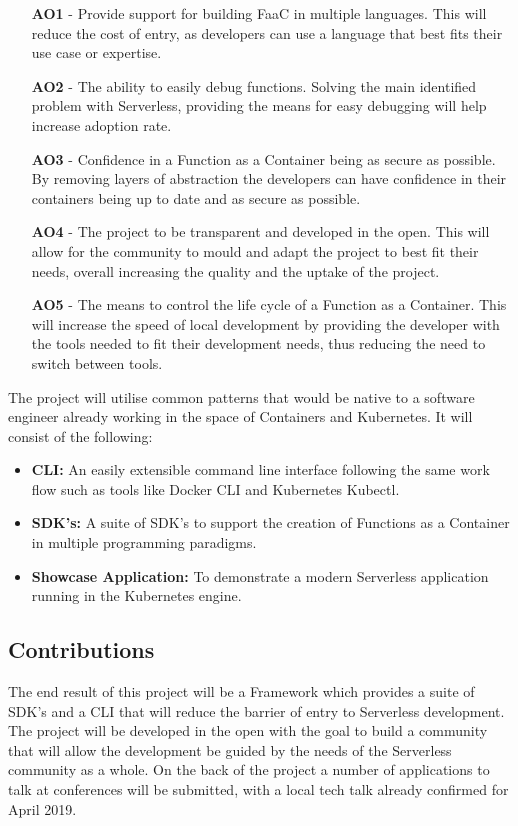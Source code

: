 \begin{itemize}
    \item [\textbf{AO1}] - Provide support for building \gls{FaaC} in multiple languages. This will reduce the cost of entry, as developers can use a language that best fits their use case or expertise.
    \item [\textbf{AO2}] - The ability to easily debug functions. Solving the main identified problem with \gls{Serverless}, providing the means for easy debugging will help increase adoption rate.
    \item [\textbf{AO3}] - Confidence in a Function as a Container being as secure as possible. By removing layers of abstraction the developers can have confidence in their containers being up to date and as secure as possible.
    \item [\textbf{AO4}] - The project to be transparent and developed in the open. This will allow for the community to mould and adapt the project to best fit their needs, overall increasing the quality and the uptake of the project.
    \item [\textbf{AO5}] - The means to control the life cycle of a Function as a Container. This will increase the speed of local development by providing the developer with the tools needed to fit their development needs, thus reducing the need to switch between tools.
\end{itemize}

The project will utilise common patterns that would be native to a software engineer already working in the space of \gls{Container}s and \gls{Kubernetes}. It will consist of the following:

\begin{itemize}
    \item \textbf{CLI:} An easily extensible command line interface following the same work flow such as tools like \gls{Docker} CLI and \gls{Kubernetes} Kubectl.
    \item \textbf{SDK's:} A suite of \gls{SDK}'s to support the creation of Functions as a Container in multiple programming paradigms.
    \item \textbf{Showcase Application:} To demonstrate a modern \gls{Serverless} application running in the \gls{Kubernetes} engine.
\end{itemize}

\subsection{Contributions}
The end result of this project will be a Framework which provides a suite of \gls{SDK}'s and a \gls{CLI} that will reduce the barrier of entry to \gls{Serverless} development. The project will be developed in the open with the goal to build a community that will allow the development be guided by the needs of the \gls{Serverless} community as a whole. On the back of the project a number of applications to talk at conferences will be submitted, with a local tech talk already confirmed for April 2019.


